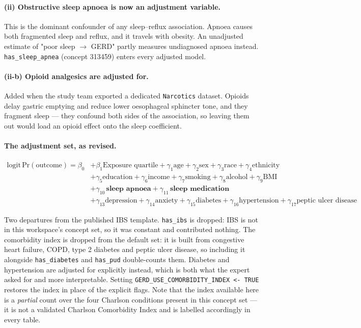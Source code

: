 \documentclass[11pt]{article}
\providecommand{\Pr}{\mathrm{Pr}}
\newcommand{\code}[1]{\texttt{\small #1}}
\begin{document}
\paragraph{(ii) Obstructive sleep apnoea is now an adjustment variable.}
This is the dominant confounder of any sleep--reflux association. Apnoea causes
both fragmented sleep and reflux, and it travels with obesity. An unadjusted
estimate of "poor sleep $\rightarrow$ GERD" partly measures undiagnosed apnoea
instead. \code{has\_sleep\_apnea} (concept 313459) enters every adjusted model.

\paragraph{(ii-b) Opioid analgesics are adjusted for.}
Added when the study team exported a dedicated \code{Narcotics} dataset. Opioids
delay gastric emptying and reduce lower oesophageal sphincter tone, and they
fragment sleep --- they confound both sides of the association, so leaving them
out would load an opioid effect onto the sleep coefficient.

\paragraph{The adjustment set, as revised.}
\[
\begin{aligned}
\text{logit}\,\Pr(\text{outcome}) = \beta_0 &+ \beta_1 \text{Exposure quartile}
 + \gamma_1 \text{age} + \gamma_2 \text{sex} + \gamma_3 \text{race} + \gamma_4 \text{ethnicity} \\
 &+ \gamma_5 \text{education} + \gamma_6 \text{income}
   + \gamma_7 \text{smoking} + \gamma_8 \text{alcohol} + \gamma_9 \text{BMI} \\
 &+ \gamma_{10}\,\textbf{sleep apnoea} + \gamma_{11}\,\textbf{sleep medication} \\
 &+ \gamma_{13} \text{depression} + \gamma_{14} \text{anxiety}
   + \gamma_{15} \text{diabetes} + \gamma_{16} \text{hypertension}
   + \gamma_{17} \text{peptic ulcer disease}
\end{aligned}
\]

\noindent Two departures from the published IBS template. \code{has\_ibs} is
dropped: IBS is not in this workspace's concept set, so it was constant and
contributed nothing. The comorbidity index is dropped from the default set: it
is built from congestive heart failure, COPD, type 2 diabetes and peptic ulcer
disease, so including it alongside \code{has\_diabetes} and \code{has\_pud}
double-counts them. Diabetes and hypertension are adjusted for explicitly
instead, which is both what the expert asked for and more interpretable.
Setting \code{GERD\_USE\_COMORBIDITY\_INDEX <- TRUE} restores the index in place
of the explicit flags. Note that the index available here is a \emph{partial}
count over the four Charlson conditions present in this concept set --- it is
not a validated Charlson Comorbidity Index and is labelled accordingly in every
table.
\end{document}
